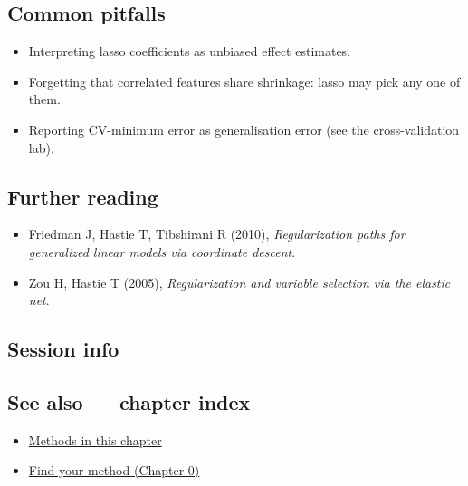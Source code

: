 \documentclass[
]{article}
\newenvironment{Shaded}{\begin{snugshade}}{\end{snugshade}}
\providecommand{\tightlist}{%
  \setlength{\itemsep}{0pt}\setlength{\parskip}{0pt}}
\begin{document}
\subsection{Common pitfalls}\label{common-pitfalls}

\begin{itemize}
\tightlist
\item
  Interpreting lasso coefficients as unbiased effect estimates.
\item
  Forgetting that correlated features share shrinkage: lasso may pick
  any one of them.
\item
  Reporting CV-minimum error as generalisation error (see the
  cross-validation lab).
\end{itemize}

\subsection{Further reading}\label{further-reading}

\begin{itemize}
\tightlist
\item
  Friedman J, Hastie T, Tibshirani R (2010), \emph{Regularization paths
  for generalized linear models via coordinate descent}.
\item
  Zou H, Hastie T (2005), \emph{Regularization and variable selection
  via the elastic net}.
\end{itemize}

\subsection{Session info}\label{session-info}

\begin{Shaded}
\begin{Highlighting}[]

\end{Highlighting}
\end{Shaded}

\subsection{See also --- chapter index}\label{see-also-chapter-index}

\begin{itemize}
\tightlist
\item
  \href{../index.Rmd}{Methods in this chapter}
\item
  \href{../../../ch00-find-your-method.Rmd}{Find your method (Chapter
  0)}
\end{itemize}
\end{document}
